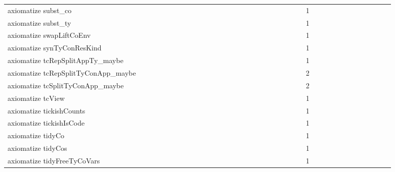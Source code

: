 {\begin{tabular}{l|rrr|rrr|rrr}
axiomatize subst_co &  &  &  &  &  &  &  &  &  &  &  &  &  &  &  &  &  &  &  &  &  &  &  & 1 &  &  &  &  &  &  &  &  &  &  &  & \\
axiomatize subst_ty &  &  &  &  &  &  &  &  &  &  &  &  &  &  &  &  &  &  &  &  &  &  &  & 1 &  &  &  &  &  &  &  &  &  &  &  & \\
axiomatize swapLiftCoEnv &  &  &  &  &  &  &  &  &  &  &  &  &  &  &  &  &  &  &  &  &  &  &  & 1 &  &  &  &  &  &  &  &  &  &  &  & \\
axiomatize synTyConResKind &  &  &  &  &  &  &  &  &  &  &  &  &  &  &  &  &  &  &  &  &  &  &  & 1 &  &  &  &  &  &  &  &  &  &  &  & \\
axiomatize tcRepSplitAppTy_maybe &  &  &  &  &  &  &  &  &  &  &  &  &  &  &  &  &  &  &  &  &  &  &  & 1 &  &  &  &  &  &  &  &  &  &  &  & \\
axiomatize tcRepSplitTyConApp_maybe &  &  &  &  &  &  &  &  &  &  &  &  &  &  &  &  &  &  &  &  &  &  &  & 2 &  &  &  &  &  &  &  &  &  &  &  & \\
axiomatize tcSplitTyConApp_maybe &  &  &  &  &  &  &  &  &  &  &  &  &  &  &  &  &  &  &  &  &  &  &  & 2 &  &  &  &  &  &  &  &  &  &  &  & \\
axiomatize tcView &  &  &  &  &  &  &  &  &  &  &  &  &  &  &  &  &  &  &  &  &  &  &  & 1 &  &  &  &  &  &  &  &  &  &  &  & \\
axiomatize tickishCounts &  &  &  &  &  &  &  &  &  &  &  &  &  &  &  &  &  &  &  &  &  &  &  & 1 &  &  &  &  &  &  &  &  &  &  &  & \\
axiomatize tickishIsCode &  &  &  &  &  &  &  &  &  &  &  &  &  &  &  &  &  &  &  &  &  &  &  & 1 &  &  &  &  &  &  &  &  &  &  &  & \\
axiomatize tidyCo &  &  &  &  &  &  &  &  &  &  &  &  &  &  &  &  &  &  &  &  &  &  &  & 1 &  &  &  &  &  &  &  &  &  &  &  & \\
axiomatize tidyCos &  &  &  &  &  &  &  &  &  &  &  &  &  &  &  &  &  &  &  &  &  &  &  & 1 &  &  &  &  &  &  &  &  &  &  &  & \\
axiomatize tidyFreeTyCoVars &  &  &  &  &  &  &  &  &  &  &  &  &  &  &  &  &  &  &  &  &  &  &  & 1 &  &  &  &  &  &  &  &  &  &  &  & \\

\end{tabular}}
